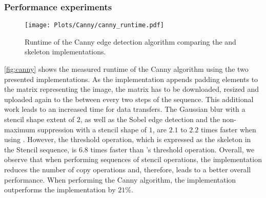 
\subsubsection*{Performance experiments}

\begin{figure}[tbp]
	\centering
	\texttt{[image: Plots/Canny/canny\_runtime.pdf]}
	\caption[Runtime of the Canny edge detection algorithm.]%
          {Runtime of the Canny edge detection algorithm comparing the  and  skeleton implementations.}
	\label{fig:canny}
\end{figure} 

\autoref{fig:canny} shows the measured runtime of the Canny algorithm using the two presented implementations.
As the  implementation appends padding elements to the matrix representing the image, the matrix has to be downloaded, resized and uploaded again to the \GPU between every two steps of the sequence.
This additional work leads to an increased time for data transfers. 
The Gaussian blur with a stencil shape extent of $2$, as well as the Sobel edge detection and the non-maximum suppression with a stencil shape of $1$, are $2.1$ to $2.2$ times faster when using . 
However, the threshold operation, which is expressed as the \map skeleton in the Stencil sequence, is $6.8$ times faster than 's threshold operation.
Overall, we observe that when performing sequences of stencil operations, the  implementation reduces the number of copy operations and, therefore, leads to a better overall performance.
When performing the Canny algorithm, the  implementation outperforms the  implementation by $21\%$.

